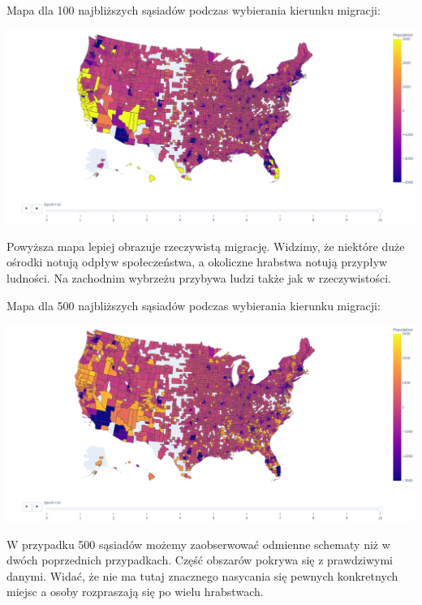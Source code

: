 \documentclass[a4paper,12pt]{article}
\begin{document}
Mapa dla 100 najbliższych sąsiadów podczas wybierania kierunku migracji:
\begin{center}
    \includegraphics*[width=15cm]{./pictures/population_k100.png}
\end{center}

Powyższa mapa lepiej obrazuje rzeczywistą migrację. Widzimy, że niektóre duże ośrodki notują odpływ społeczeństwa, a okoliczne hrabstwa notują przypływ ludności. Na zachodnim wybrzeżu przybywa ludzi także jak w rzeczywistości. 


Mapa dla 500 najbliższych sąsiadów podczas wybierania kierunku migracji:
\begin{center}
    \includegraphics*[width=15cm]{./pictures/population_k500.png}
\end{center}

W przypadku 500 sąsiadów możemy zaobserwować odmienne schematy niż w dwóch poprzednich przypadkach. Część obszarów pokrywa się z prawdziwymi danymi. Widać, że nie ma tutaj znacznego nasycania się pewnych konkretnych miejsc a osoby rozpraszają się po wielu hrabstwach.
\end{document}
